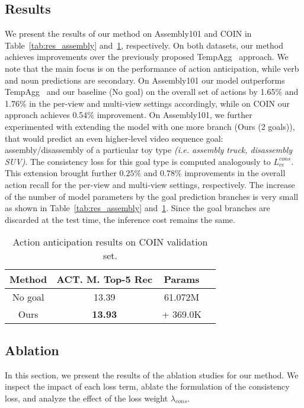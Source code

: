 \documentclass{article}
\begin{document}
\vspace{-0.25cm}
\subsection{Results}
\label{subsec:results}
\vspace{-0.1cm}
We present the results of our method on Assembly101 and COIN  in Table~\ref{tab:res_assembly} and~\ref{tab:res_coin}, respectively. On both datasets, our method achieves improvements over the previously proposed TempAgg~\cite{sener2022assembly101} approach. We note that the main focus is on the performance of action anticipation, while verb and noun predictions are secondary. On Assembly101 our model outperforms TempAgg~\cite{sener2022assembly101} and our baseline (No goal) on the overall set of actions by 1.65\% and 1.76\% in the per-view and multi-view settings accordingly, while on COIN our approach achieves 0.54\% improvement. On Assembly101, we further experimented with extending the model with one more branch (Ours (2 goals)), that would predict an even higher-level video sequence goal: assembly/disassembly of a particular toy type \textit{(i.e. assembly truck, disassembly SUV)}. The consistency loss for this goal type is computed analogously to $L_{ce}^{cons}$. This extension brought further $0.25\%$ and $0.78\%$ improvements in the overall action recall for the per-view and multi-view settings, respectively. The increase of the number of model parameters by the goal prediction branches is very small as shown in Table~\ref{tab:res_assembly} and~\ref{tab:res_coin}. Since the goal branches are discarded at the test time, the inference cost remains the same.

\begin{table}[h!]
    \centering
    \scriptsize
    \begin{tabular}{|c|c|c|c|}
        \hline
         Method & ACT. M. Top-5 Rec & Params \\
         \hline
         No goal & 13.39 & 61.072M \\
         Ours & \textbf{13.93} & + 369.0K \\
        \hline
    \end{tabular}
    \caption{\small Action anticipation results on COIN validation set.}
    \label{tab:res_coin}
\end{table}
\vspace{-0.6cm}

\subsection{Ablation}
\vspace{-0.1cm}
In this section, we present the results of the ablation studies for our method. We inspect the impact of each loss term, ablate the formulation of the consistency loss, and analyze the effect of the loss weight $\lambda_{cons}$.
\end{document}
